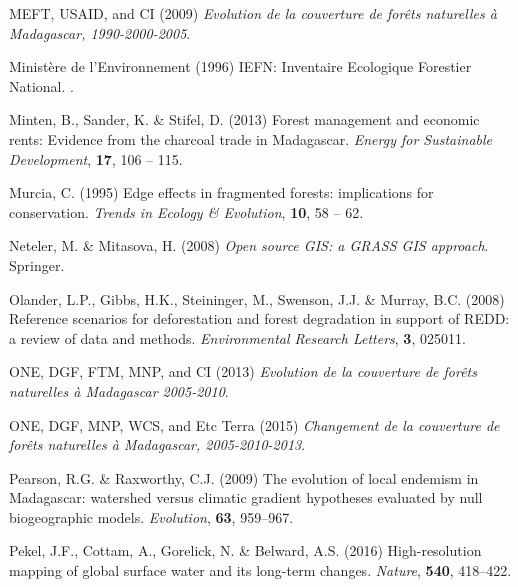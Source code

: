 \documentclass[a4paper, 12pt, leqno]{article} %
\begin{document}
\begin{thebibliography}{55}
{MEFT, USAID, and CI} (2009) \emph{{Evolution de la couverture de forêts
  naturelles à Madagascar, 1990-2000-2005}}.

{Ministère de l'Environnement} (1996) {IEFN: Inventaire Ecologique Forestier
  National}.
.

Minten, B., Sander, K. \& Stifel, D. (2013) {Forest management and economic
  rents: Evidence from the charcoal trade in Madagascar}.
\newblock \emph{Energy for Sustainable Development}, \textbf{17}, 106 -- 115.

Murcia, C. (1995) Edge effects in fragmented forests: implications for
  conservation.
\newblock \emph{Trends in Ecology \& Evolution}, \textbf{10}, 58 -- 62.

Neteler, M. \& Mitasova, H. (2008) \emph{{Open source GIS: a GRASS GIS
  approach}}.
\newblock Springer.

Olander, L.P., Gibbs, H.K., Steininger, M., Swenson, J.J. \& Murray, B.C.
  (2008) {Reference scenarios for deforestation and forest degradation in
  support of REDD: a review of data and methods}.
\newblock \emph{Environmental Research Letters}, \textbf{3}, 025011.

{ONE, DGF, FTM, MNP, and CI} (2013) \emph{{Evolution de la couverture de
  forêts naturelles à Madagascar 2005-2010}}.

{ONE, DGF, MNP, WCS, and Etc Terra} (2015) \emph{{Changement de la couverture
  de forêts naturelles à Madagascar, 2005-2010-2013}}.

Pearson, R.G. \& Raxworthy, C.J. (2009) {The evolution of local endemism in
  Madagascar: watershed versus climatic gradient hypotheses evaluated by null
  biogeographic models}.
\newblock \emph{Evolution}, \textbf{63}, 959--967.

Pekel, J.F., Cottam, A., Gorelick, N. \& Belward, A.S. (2016) {High-resolution
  mapping of global surface water and its long-term changes}.
\newblock \emph{Nature}, \textbf{540}, 418--422.


\end{thebibliography}
\end{document}
